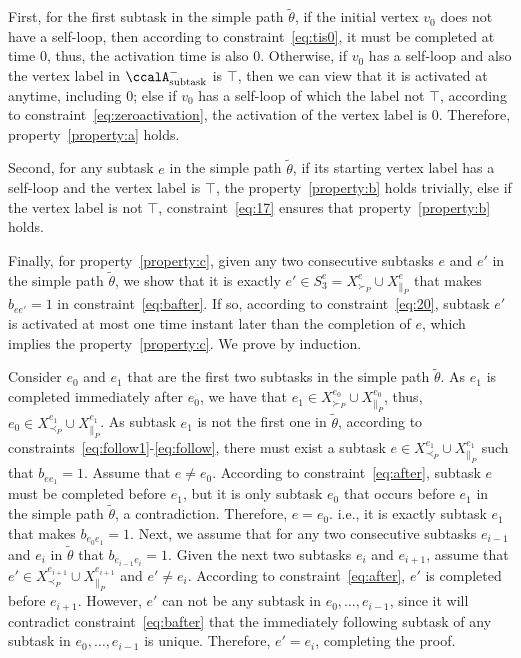 \documentclass[Afour,sageh,times]{sagej}
\newcommand{\auto}[1]{\ccalA_{\textup{#1}}}
\begin{document}
{{First, for the first subtask in the simple path $\tilde{\theta}$, if the initial vertex $v_0$ does not have a self-loop, then according to constraint~\eqref{eq:tis0}, it must be completed at time 0, thus, the activation time is also 0. Otherwise, if $v_0$ has a self-loop and also the vertex label in $\auto{subtask}^-$ is $\top$, then we can view that it is activated at anytime, including 0; else if $v_0$ has a self-loop of which the  label  not $\top$, according to constraint~\eqref{eq:zeroactivation}, the activation of the vertex label is 0. Therefore, property~\ref{property:a} holds.

Second, for any subtask $e$ in the simple path $\tilde{\theta}$, if its starting vertex label has a self-loop and the vertex label is $\top$, the property~\ref{property:b} holds trivially, else if the vertex label is not $\top$,  constraint~\eqref{eq:17} ensures that  property~\ref{property:b} holds.

Finally,  for  property~\ref{property:c}, given any two consecutive subtasks $e$ and $e'$ in the simple path $\tilde{\theta}$, we show that it is exactly $e' \in S_3^e = X^e_{\succ_{P}} \cup X^e_{\|_{P}}$ that makes $b_{ee'}=1$ in constraint~\eqref{eq:bafter}. If so, according to constraint~\eqref{eq:20}, subtask $e'$ is activated at most one time instant later than the completion of $e$, which implies the property~\ref{property:c}. We prove by induction.

Consider $e_0$ and $e_1$ that are the first two subtasks in the simple path $\tilde{\theta}$. As $e_1$ is completed immediately after $e_0$, we have that $e_1\in X^{e_0}_{\succ_{P}} \cup X^{e_0}_{\|_{P}} $, thus, ${e_0} \in X^{e_1}_{\prec_{P}} \cup X^{e_1}_{\|_{P}}$. As subtask $e_1$ is not the first one in $\tilde{\theta}$, according to constraints~\eqref{eq:follow1}-\eqref{eq:follow}, there must exist  a subtask $e \in X^{e_1}_{\prec_{P}} \cup X^{e_1}_{\|_{P}} $ such that $b_{e e_1}=1$. Assume that $e \neq e_0$. According to constraint~\eqref{eq:after}, subtask $e$ must be completed before $e_1$, but it is only subtask $e_0$ that occurs before $e_1$ in the simple path $\tilde{\theta}$, a contradiction. Therefore, $e  = e_0$. i.e., it is exactly subtask $e_1$ that makes $b_{e_0 e_1}=1$. Next, we assume that for any two consecutive subtasks $e_{i-1}$ and $e_{i}$ in $\tilde{\theta}$ that $b_{e_{i-1} e_i} = 1$. Given the next two subtasks $e_{i}$ and $e_{i+1}$, assume that $e' \in X^{e_{i+1}}_{\prec_{P}} \cup X^{e_{i+1}}_{\|_{P}}$ and $e' \neq e_i$. According to constraint~\eqref{eq:after}, $e'$ is completed before $e_{i+1}$. However, $e'$ can not be any subtask in $e_0, \ldots, e_{i-1}$, since it will contradict constraint~\eqref{eq:bafter} that the immediately following subtask of any subtask in $e_0, \ldots, e_{i-1}$ is unique. Therefore, $e' = e_i$, completing the proof.




}}
\end{document}
